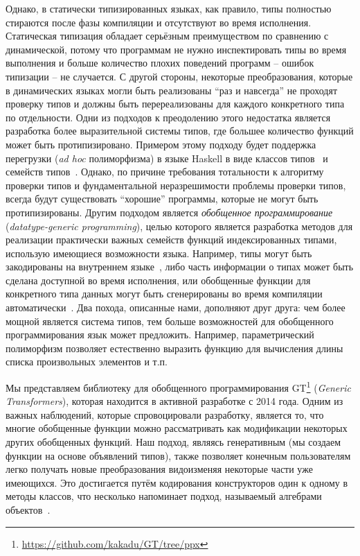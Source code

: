 Однако, в статически типизированных языках, как правило, типы полностью стираются 
после фазы компиляции и отсутствуют во время исполнения. Статическая типизация обладает серьёзным преимуществом по сравнению с динамической, потому что программам
не нужно инспектировать типы во время выполнения и больше количество плохих поведений программ -- ошибок типизации -- не случается. С другой стороны, некоторые преобразования, которые в динамических языках могли быть реализованы ``раз и навсегда'' не проходят проверку типов и должны быть перереализованы для каждого конкретного типа по отдельности. Одни из подходов к преодолению этого недостатка является разработка более выразительной системы типов, где большее количество функций может быть протипизировано. Примером этому подходу будет поддержка перегрузки (\emph{ad hoc} полиморфизма) в языке Haskell в виде классов 
типов~\cite{TypeClasses} и семейств типов~\cite{TypeFamilies}. Однако, по причине требования тотальности к алгоритму проверки типов и фундаментальной неразрешимости проблемы проверки типов, всегда будут существовать ``хорошие'' программы, которые
не могут быть протипизированы. Другим подходом является \emph{обобщенное программирование}~\cite{DGP} (\emph{datatype-generic programming}), целью которого является разработка методов для реализации практически важных семейств функций
индексированных типами, использую имеющиеся возможности языка. Например, типы могут быть закодированы на внутреннем языке~\cite{Hinze,InstantGenerics,GenericOCaml}, либо часть информации о типах может быть сделана доступной во время исполнения, или 
обобщенные функции для конкретного типа данных могут быть сгенерированы во время
компиляции автоматически~\cite{Yallop,PPXLib}. Два похода, описанные нами, дополняют друг друга: чем более мощной является система типов, тем больше возможностей для обобщенного программирования язык может предложить. Например, параметрический полиморфизм позволяет естественно выразить функцию для вычисления длины списка произвольных элементов и т.п.

Мы представляем библиотеку для обобщенного программирования \textsc{GT}\footnote{\url{https://github.com/kakadu/GT/tree/ppx}} (\emph{Generic Transformers}), которая находится в активной разработке с 2014 года. Одним из важных наблюдений, которые спровоцировали разработку, является то, что многие обобщенные функции можно рассматривать как модификации некоторых других обобщенных функций. Наш подход, являясь генеративным (мы создаем функции на основе объявлений типов), также позволяет конечным пользователям легко получать новые преобразования видоизменяя некоторые части уже имеющихся. Это достигается путём кодирования конструкторов один к одному в методы классов, что несколько напоминает подход, называемый алгебрами объектов~\cite{ObjectAlgebras}.

